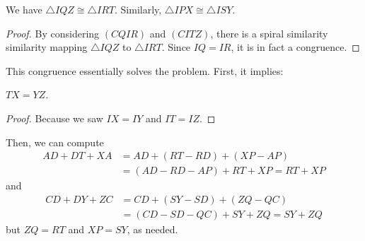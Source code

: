 \begin{claim*}
  We have $\triangle IQZ \cong \triangle IRT$.
  Similarly, $\triangle IPX \cong \triangle ISY$.
\end{claim*}
\begin{proof}
  By considering $(CQIR)$ and $(CITZ)$,
  there is a spiral similarity similarity
  mapping $\triangle IQZ$ to $\triangle IRT$.
  Since $IQ = IR$, it is in fact a congruence.
\end{proof}

This congruence essentially solves the problem.
First, it implies:
\begin{claim*}
  $TX = YZ$.
\end{claim*}
\begin{proof}
  Because we saw $IX = IY$ and $IT = IZ$.
\end{proof}
Then, we can compute
\begin{align*}
  AD + DT + XA
  &= AD + (RT - RD) + (XP-AP) \\
  &= (AD-RD-AP) + RT + XP = RT + XP
\end{align*}
and
\begin{align*}
  CD + DY + ZC &= CD + (SY-SD) + (ZQ-QC) \\
  &= (CD-SD-QC) + SY + ZQ = SY + ZQ
\end{align*}
but $ZQ = RT$ and $XP = SY$, as needed.
